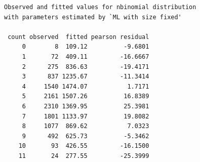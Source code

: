 \documentclass[10pt]{report}\usepackage[]{graphicx}\usepackage[]{color}
\makeatletter
\newenvironment{kframe}{%
 \def\at@end@of@kframe{}%
 \ifinner\ifhmode%
  \def\at@end@of@kframe{\end{minipage}}%
  \begin{minipage}{\columnwidth}%
 \fi\fi%
 \def\FrameCommand##1{\hskip\@totalleftmargin \hskip-\fboxsep
 \colorbox{shadecolor}{##1}\hskip-\fboxsep
     \hskip-\linewidth \hskip-\@totalleftmargin \hskip\columnwidth}%
 \MakeFramed {\advance\hsize-\width
   \@totalleftmargin\z@ \linewidth\hsize
   \@setminipage}}%
 {\par\unskip\endMakeFramed%
 \at@end@of@kframe}
\newenvironment{knitrout}{}{} %
\renewenvironment{knitrout}{\small\renewcommand{\baselinestretch}{.85}}{} %
\makeatother
\begin{document}
\begin{Exercises}
\begin{enumerate*}
\begin{ans}
\begin{knitrout}
\begin{kframe}
\begin{verbatim}
Observed and fitted values for nbinomial distribution
with parameters estimated by `ML with size fixed' 

 count observed  fitted pearson residual
     0        8  109.12          -9.6801
     1       72  409.11         -16.6667
     2      275  836.63         -19.4171
     3      837 1235.67         -11.3414
     4     1540 1474.07           1.7171
     5     2161 1507.26          16.8389
     6     2310 1369.95          25.3981
     7     1801 1133.97          19.8082
     8     1077  869.62           7.0323
     9      492  625.73          -5.3462
    10       93  426.55         -16.1500
    11       24  277.55         -25.3999
\end{verbatim}
\end{kframe}
\end{knitrout}
    \end{ans}
    
  \end{enumerate*}


\end{Exercises}
\end{document}
